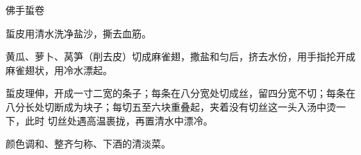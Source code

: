\begin{recipe}{佛手蜇卷}

\ingredients


\cooking

\step 蜇皮用清水洗净盐沙，撕去血筋。

\step 黄瓜、萝卜、莴笋（削去皮）切成麻雀翅，撒盐和匀后，挤去水份，用手指抡开成
麻雀翅状，用冷水漂起。

\step 蜇皮理伸，开成一寸二宽的条子；每条在八分宽处切成丝，留四分宽不切；每条在
八分长处切断成为块子；每切五至六块重叠起，夹着没有切丝这一头入汤中烫一下，此时
切丝处遇高温裹拢，再置清水中漂冷。

\notes

颜色调和、整齐匀称、下酒的清淡菜。

\end{recipe}

